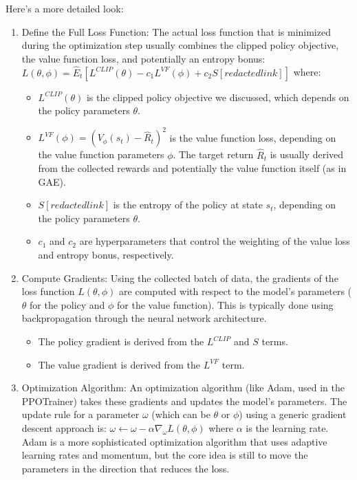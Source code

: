 \documentclass[10pt,a4paper]{report}
\begin{document}
Here's a more detailed look:
\begin{enumerate}
\item    Define the Full Loss Function: The actual loss function that is minimized during the optimization step usually combines the clipped policy objective, the value function loss, and potentially an entropy bonus: $L(\theta, \phi) = \hat{E}_t [L^{CLIP}(\theta) - c_1 L^{VF}(\phi) + c_2 S[redacted link]]$ where:
\begin{itemize}
\item        $L^{CLIP}(\theta)$ is the clipped policy objective we discussed, which depends on the policy parameters $\theta$.
\item        $L^{VF}(\phi) = (V_\phi(s_t) - \hat{R}_t)^2$ is the value function loss, depending on the value function parameters $\phi$. The target return $\hat{R}_t$ is usually derived from the collected rewards and potentially the value function itself (as in GAE).
\item       $S[redacted link]$ is the entropy of the policy at state $s_t$, depending on the policy parameters $\theta$.
\item       $c_1$ and $c_2$ are hyperparameters that control the weighting of the value loss and entropy bonus, respectively.
\end{itemize}

 \item   Compute Gradients: Using the collected batch of data, the gradients of the loss function $L(\theta, \phi)$ are computed with respect to the model's parameters ($\theta$ for the policy and $\phi$ for the value function). This is typically done using backpropagation through the neural network architecture.
\begin{itemize}
\item        The policy gradient is derived from the $L^{CLIP}$ and $S$ terms.
\item        The value gradient is derived from the $L^{VF}$ term.
\end{itemize}

\item    Optimization Algorithm: An optimization algorithm (like Adam, used in the PPOTrainer) takes these gradients and updates the model's parameters. The update rule for a parameter $\omega$ (which can be $\theta$ or $\phi$) using a generic gradient descent approach is: $\omega \leftarrow \omega - \alpha \nabla_\omega L(\theta, \phi)$ where $\alpha$ is the learning rate. Adam is a more sophisticated optimization algorithm that uses adaptive learning rates and momentum, but the core idea is still to move the parameters in the direction that reduces the loss.


\end{enumerate}
\end{document}
